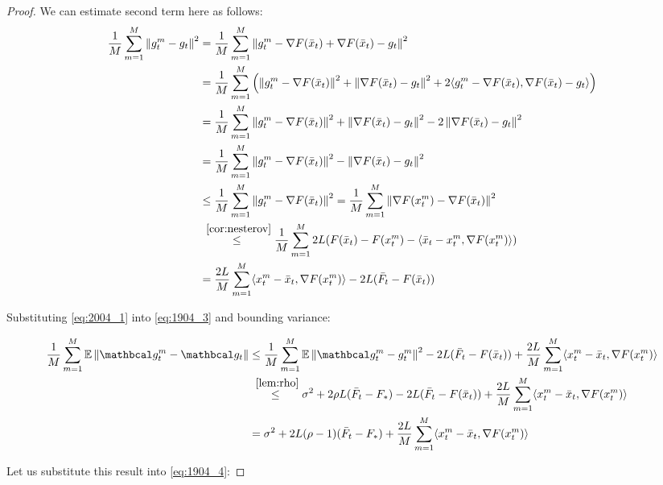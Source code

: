 \begin{proof}
    We can estimate second term here as follows:
    \begin{align}
        \fsumm{m=1}{M} \norm{g^m_t - g_t}^2 
        &=
        \fsumm{m=1}{M} \norm{g^m_t - \nabla F(\bar{x}_t) + \nabla F(\bar{x}_t) - g_t}^2 \\
        &=
        \fsumm{m=1}{M} \left( \norm{g^m_t - \nabla F(\bar{x}_t)}^2 + \norm{\nabla F(\bar{x}_t) - g_t}^2 + 2 \inner{g^m_t - \nabla F(\bar{x}_t)}{\nabla F(\bar{x}_t) - g_t} \right) \\
        &= 
        \fsumm{m=1}{M} \norm{g^m_t - \nabla F(\bar{x}_t)}^2 + \norm{\nabla F(\bar{x}_t) - g_t}^2 - 2 \norm{\nabla F(\bar{x}_t) - g_t}^2 \\
        &= 
        \fsumm{m=1}{M} \norm{g^m_t - \nabla F(\bar{x}_t)}^2 - \norm{\nabla F(\bar{x}_t) - g_t}^2 \\
        &\leq 
        \fsumm{m=1}{M} \norm{g^m_t - \nabla F(\bar{x}_t)}^2
        =
        \fsumm{m=1}{M} \norm{\nabla F(x^m_t) - \nabla F(\bar{x}_t)}^2 \\
        &\overset{~\ref{cor:nesterov}}{\leq}
        \fsumm{m=1}{M} 2L (F(\bar{x}_t) - F(x^m_t) - \inner{\bar{x}_t - x^m_t}{\nabla F(x^m_t)}) \\
        &=
        \frac{2L}{M} \summ{m=1}{M} \inner{x^m_t - \bar{x}_t}{\nabla F(x^m_t)}
        - 2L (\bar{F}_t-F(\bar{x}_t)) \label{eq:2004_1}
    \end{align}

    Substituting \eqref{eq:2004_1} into \eqref{eq:1904_3} and bounding variance:

    \begin{align}
        \fsumm{m=1}{M} \E \norm{\mc{g}^m_t - \mc{g}_t} 
        &\leq
        \fsumm{m=1}{M} \E \norm{\mc{g}^m_t - g^m_t}^2 
        - 
        2L (\bar{F}_t-F(\bar{x}_t))
        +
        \frac{2L}{M} \summ{m=1}{M} \inner{x^m_t - \bar{x}_t}{\nabla F(x^m_t)} \\
        &\overset{~\ref{lem:rho}}{\leq}
        \sigma^2 + 2 \rho L (\bar{F}_t - F_*) 
        - 
        2L (\bar{F}_t-F(\bar{x}_t))
        +
        \frac{2L}{M} \summ{m=1}{M} \inner{x^m_t - \bar{x}_t}{\nabla F(x^m_t)} \\
        &=
        \sigma^2 + 2 L (\rho - 1) (\bar{F}_t - F_*) 
        +
        \frac{2L}{M} \summ{m=1}{M} \inner{x^m_t - \bar{x}_t}{\nabla F(x^m_t)}
    \end{align}

    Let us substitute this result into \eqref{eq:1904_4}:


\end{proof}
